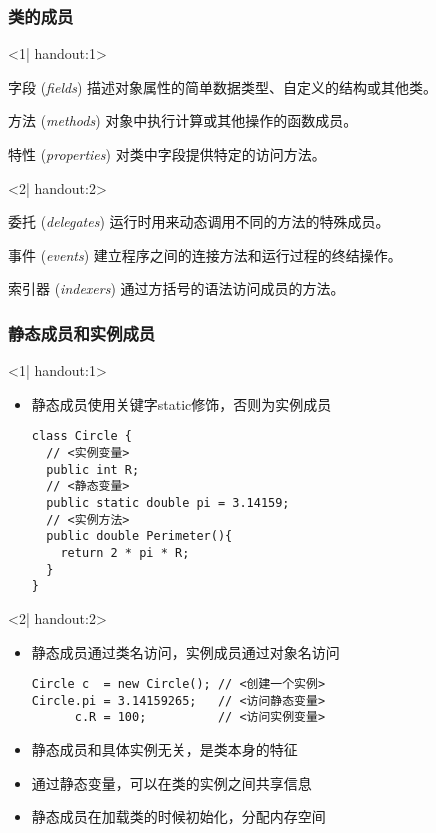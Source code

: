 \begin{frame}
\frametitle{类的成员}
\begin{onlyenv}<1| handout:1>
  \begin{block}{字段 (\textit{fields})}
    描述对象属性的简单数据类型、自定义的结构或其他类。
  \end{block}
  \begin{block}{方法 (\textit{methods})}
    对象中执行计算或其他操作的函数成员。
  \end{block}
  \begin{block}{特性 (\textit{properties})}
    对类中字段提供特定的访问方法。
  \end{block}
\end{onlyenv}
\begin{onlyenv}<2| handout:2>
  \begin{block}{委托 (\textit{delegates})}
    运行时用来动态调用不同的方法的特殊成员。
  \end{block}
  \begin{block}{事件 (\textit{events})}
    建立程序之间的连接方法和运行过程的终结操作。
  \end{block}
  \begin{block}{索引器 (\textit{indexers})}
    通过方括号的语法访问成员的方法。
  \end{block}
\end{onlyenv}
\end{frame}


\begin{frame}[fragile]
\frametitle{静态成员和实例成员}
\begin{onlyenv}<1| handout:1>
  \begin{itemize}
  \item 静态成员使用关键字static修饰，否则为实例成员
\begin{lstlisting}[escapeinside=<>]
class Circle {
  // <实例变量>
  public int R;
  // <静态变量>
  public static double pi = 3.14159;
  // <实例方法>
  public double Perimeter(){
    return 2 * pi * R;
  }
}
\end{lstlisting}

  \end{itemize}
\end{onlyenv}
\begin{onlyenv}<2| handout:2>
  \begin{itemize}
\setlength{\itemsep}{8pt plus 1pt}
  \item 静态成员通过类名访问，实例成员通过对象名访问
\begin{lstlisting}[escapeinside=<>]
Circle c  = new Circle(); // <创建一个实例>
Circle.pi = 3.14159265;   // <访问静态变量>
      c.R = 100;          // <访问实例变量>
\end{lstlisting}
  \item 静态成员和具体实例无关，是类本身的特征
  \item 通过静态变量，可以在类的实例之间共享信息
  \item 静态成员在加载类的时候初始化，分配内存空间
  \end{itemize}
\end{onlyenv}
\end{frame}

